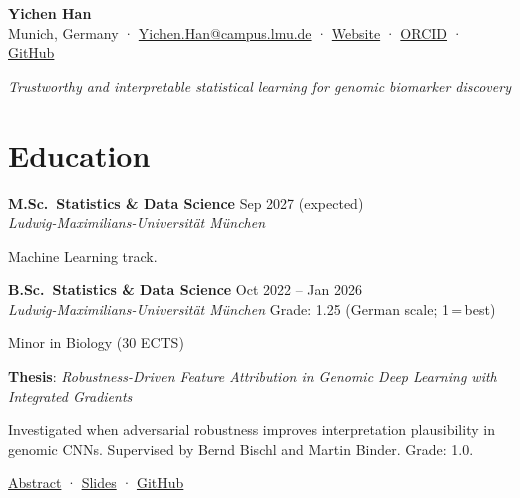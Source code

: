\documentclass[a4paper,11pt]{article}
\newcommand{\entry}[4]{%
  \textbf{#1} \hfill #2\\
  \textit{#3} \hfill #4\par
}
\newenvironment{details}{%
  \begin{list}{}{%
    \setlength{\leftmargin}{1.5em}%
    \setlength{\rightmargin}{0pt}%
    \setlength{\topsep}{0.1em}%
    \setlength{\parsep}{0.2em}%
    \setlength{\itemsep}{0pt}%
  }%
  \item[]%
}{%
  \end{list}%
}
\begin{document}
\thispagestyle{empty}

\begin{center}
  {\LARGE\bfseries Yichen Han}\\[8pt]
  {\small
    Munich, Germany \enspace·\enspace
    \href{mailto:Yichen.Han@campus.lmu.de}{Yichen.Han@campus.lmu.de} \enspace·\enspace
    \href{https://yhan228.github.io/}{Website} \enspace·\enspace
    \href{https://orcid.org/0009-0008-7018-8949}{ORCID} \enspace·\enspace
    \href{https://github.com/YHan228}{GitHub}
  }
\end{center}

\vspace{0.4em}
\begin{center}
  {\small\textit{Trustworthy and interpretable statistical learning for genomic biomarker discovery}}
\end{center}
\vspace{0.4em}

\section*{Education}

\entry{M.Sc.\ Statistics \& Data Science}{Sep 2027 (expected)}
      {Ludwig-Maximilians-Universität München}{}
\begin{details}
Machine Learning track.
\end{details}

\entry{B.Sc.\ Statistics \& Data Science}{Oct 2022 -- Jan 2026}
      {Ludwig-Maximilians-Universität München}{Grade: 1.25 (German scale; 1\,=\,best)}
\begin{details}
Minor in Biology (30 ECTS)

\textbf{Thesis}: \emph{Robustness-Driven Feature Attribution in Genomic Deep Learning with Integrated Gradients}

Investigated when adversarial robustness improves interpretation plausibility in genomic CNNs. Supervised by Bernd Bischl and Martin Binder. Grade: 1.0.

{\small \href{https://yhan228.github.io/files/thesis_abstract.pdf}{Abstract} · \href{https://yhan228.github.io/files/thesis_defense_slides.pdf}{Slides} · \href{https://github.com/YHan228/GenomeInterpretation}{GitHub}}
\end{details}

\end{document}

